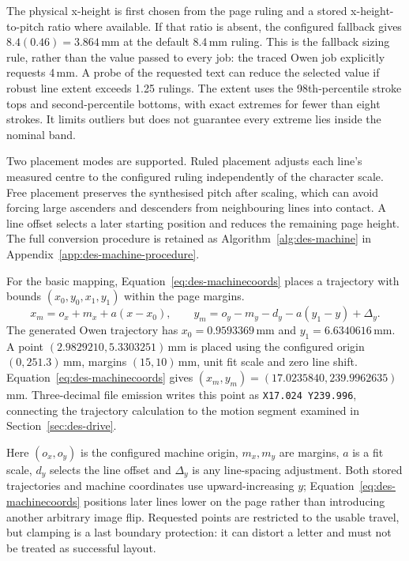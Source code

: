 The physical x-height is first chosen from the page ruling and a stored x-height-to-pitch ratio where available. If that ratio is absent, the configured fallback gives $8.4(0.46)=3.864$\,mm at the default 8.4\,mm ruling. This is the fallback sizing rule, rather than the value passed to every job: the traced Owen job explicitly requests 4\,mm. A probe of the requested text can reduce the selected value if robust line extent exceeds 1.25 rulings. The extent uses the 98th-percentile stroke tops and second-percentile bottoms, with exact extremes for fewer than eight strokes. It limits outliers but does not guarantee every extreme lies inside the nominal band.

Two placement modes are supported. Ruled placement adjusts each line's measured centre to the configured ruling independently of the character scale. Free placement preserves the synthesised pitch after scaling, which can avoid forcing large ascenders and descenders from neighbouring lines into contact. A line offset selects a later starting position and reduces the remaining page height. The full conversion procedure is retained as Algorithm~\ref{alg:des-machine} in Appendix~\ref{app:des-machine-procedure}.

For the basic mapping, Equation~\ref{eq:des-machinecoords} places a trajectory with bounds $(x_0,y_0,x_1,y_1)$ within the page margins.
\begin{equation}
x_m=o_x+m_x+a(x-x_0),\qquad
y_m=o_y-m_y-d_y-a(y_1-y)+\Delta_y.
\label{eq:des-machinecoords}
\end{equation}
The generated Owen trajectory has $x_0=0.9593369$\,mm and $y_1=6.6340616$\,mm. A point $(2.9829210,5.3303251)$\,mm is placed using the configured origin $(0,251.3)$\,mm, margins $(15,10)$\,mm, unit fit scale and zero line shift. Equation~\ref{eq:des-machinecoords} gives $(x_m,y_m)=(17.0235840,239.9962635)$\,mm. Three-decimal file emission writes this point as \texttt{X17.024 Y239.996}, connecting the trajectory calculation to the motion segment examined in Section~\ref{sec:des-drive}.

Here $(o_x,o_y)$ is the configured machine origin, $m_x,m_y$ are margins, $a$ is a fit scale, $d_y$ selects the line offset and $\Delta_y$ is any line-spacing adjustment. Both stored trajectories and machine coordinates use upward-increasing $y$; Equation~\ref{eq:des-machinecoords} positions later lines lower on the page rather than introducing another arbitrary image flip. Requested points are restricted to the usable travel, but clamping is a last boundary protection: it can distort a letter and must not be treated as successful layout.


